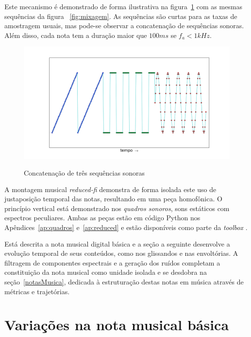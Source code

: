 Este mecanismo é demonstrado de forma ilustrativa na figura~\ref{fig:concatenacao} com as mesmas sequências da figura ~\ref{fig:mixagem}.
 As sequências são curtas para as taxas de amostragem usuais, mas pode-se observar a concatenação de sequências sonoras. Além disso, cada nota tem a duração maior que $100ms$ se $f_a<1kHz$.

\begin{figure}[h!]
{    \centering
        \includegraphics[width=\textwidth]{figuras/concatenacao}}
    \caption{Concatenação de três sequências sonoras}
        \label{fig:concatenacao}
\end{figure}

A montagem musical \emph{reduced-fi} demonstra de forma isolada este uso de justaposição temporal das notas, resultando em uma peça homofônica. O princípio vertical está demonstrado nos \emph{quadros sonoros}, sons estáticos com espectros peculiares. Ambas as peças estão em código Python nos Apêndices~\ref{ap:quadros} e~\ref{ap:reduced} e estão disponíveis como parte da \emph{toolbox} \massa.\cite{MASSA}

Está descrita a nota musical digital básica e a seção a seguinte desenvolve a evolução temporal de seus conteúdos, como nos glissandos e nas envoltórias. A filtragem de componentes espectrais e a geração dos ruídos completam a constituição da nota musical como unidade isolada e se desdobra na seção~\ref{notasMusica}, dedicada à estruturação destas notas em música através de métricas e trajetórias.




\clearpage

\section{Variações na nota musical básica}\label{varInternas}

